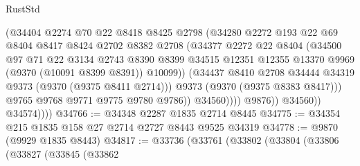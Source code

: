 \begin{lexlean}{RustStd}
\begin{coremodule}
                              (@34404
                                @2274
                                @70
                                @22
                                @8418
                                @8425
                                @2798
                                (@34280
                                  @2272
                                  @193
                                  @22
                                  @69
                                  @8404
                                  @8417
                                  @8424
                                  @2702
                                  @8382
                                  @2708
                                  (@34377
                                    @2272
                                    @22
                                    @8404
                                    (@34500
                                      @97
                                      @71
                                      @22
                                      @3134
                                      @2743
                                      @8390
                                      @8399
                                      @34515
                                      @12351
                                      @12355
                                      @13370
                                      @9969
                                      (@9370 (@10091 @8399 @8391))
                                      @10099))
                                  (@34437
                                    @8410
                                    @2708
                                    @34444
                                    @34319
                                    @9373
                                    (@9370 (@9375 @8411 @2714)))
                                  @9373
                                  (@9370 (@9375 @8383 @8417)))
                                @9765
                                @9768
                                @9771
                                @9775
                                @9780
                                @9786))
                            @34560))))
                    @9876))
                @34560))
            @34574))))
@34766 := @34348 @2287 @1835 @2714 @8445
@34775 := @34354 @215 @1835 @158 @27 @2714 @2727 @8443 @9525 @34319
@34778 := @9870 (@9929 @1835 @8443)
@34817 := @33736
    (@33761
      (@33802
        (@33804
          (@33806
            (@33827
              (@33845
                (@33862

\end{coremodule}
\end{lexlean}
